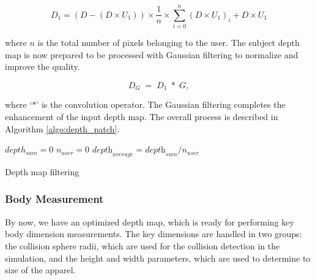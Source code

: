 \documentclass[number,preprint,review,12pt]{elsarticle}
\begin{document}
\begin{equation}
D_1=(D-(D \times U_1 )) \times \frac{1}{n} \times \sum\limits_{i=0}^n \left(D \times U_1 \right)_i + D \times U_1
\label{eqn:patch_depth}
\end{equation}

{\color{red} where $n$ is the total number of pixels belonging to the user}. The subject depth map is now prepared to be processed with Gaussian filtering to normalize and improve the quality. 

\begin{equation}
D_G\;=\;D_1\;*\;G, 
\label{eqn:gaussian_convolution}
\end{equation}

\noindent where `$*$' is the convolution operator. The Gaussian filtering completes the enhancement of the input depth map. 
The overall process is described in Algorithm \ref{algo:depth_patch}.

\singlespacing

\begin{algorithm}
\DontPrintSemicolon 
{}
$depth_{sum}=0$ \;
$n_{user} =0$\;
$\textit{depth}_\textit{average}=\textit{depth}_\textit{sum}/n_\textit{user}$ \;
 
\caption{Depth map filtering}
\label{algo:depth_patch}
\end{algorithm}

\doublespacing

\subsubsection{Body Measurement}
\label{subsubsec:4.2} 

By now, we have an optimized depth map, which is ready for performing key body dimension measurements. The key dimensions are handled in two groups:
 the collision sphere radii, which are used for the collision detection in the simulation, and the height and width parameters, which are used to determine to size of the apparel. 
\end{document}
